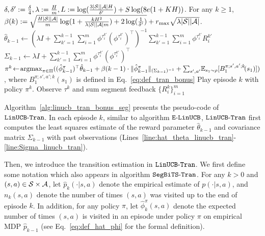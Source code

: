\begin{algorithm}[t]
	\caption{$\linucbtranseg$} \label{alg:linucb_tran_bonus_seg}
	\begin{algorithmic}[1]
	 $\delta,\delta':=\frac{\delta}{4},\lambda:=\frac{H}{m},L:=\log(\frac{3|\mathcal{S}||\mathcal{A}|H}{\delta'})+S\log(8e(1+KH))$. For any $k\geq1$, $\beta(k):=\sqrt{\frac{H|\mathcal{S}||\mathcal{A}|}{m} \log(1+\frac{kH^2}{\lambda|\mathcal{S}||\mathcal{A}|m})+2\log(\frac{1}{\delta'})} + r_{\max} \sqrt{\lambda|\mathcal{S}||\mathcal{A}|}$.
		\STATE $\hat{\theta}_{k-1} \leftarrow (\lambda I + \sum_{k'=1}^{k-1} \sum_{i=1}^{m} \phi^{\tau^{k'}_i} (\phi^{\tau^{k'}_i})^\top)^{-1} \sum_{k'=1}^{k-1} \sum_{i=1}^{m} \phi^{\tau^{k'}_i} R^{k'}_i$\; \label{line:hat_theta_linucb_tran}
		\STATE $\Sigma_{k-1} \leftarrow \lambda I + \sum_{k'=1}^{k-1} \sum_{i=1}^{m} \phi^{\tau^{k'}_i} (\phi^{\tau^{k'}_i})^\top$\; \label{line:Sigma_linucb_tran}
		\STATE $\pi^k \!\leftarrow\! \argmax_{\pi \in \Pi} ((\hat{\phi}_{k-1}^{\pi})^\top \hat{\theta}_{k-1} + \beta(k-1) \cdot  \|\hat{\phi}_{k-1}^{\pi}\|_{(\Sigma_{k-1})^{-1}} + \sum_{s',a'}\! \ex_{s_1 \sim \rho}[B^{\pi;s',a';k}_1\!(s_1)] )$, where $B^{\pi;s',a';k}_1(s_1)$ is defined in Eq.~\eqref{eq:def_tran_bonus}\; \label{line:pi_k_linucb_tran}
		\STATE Play episode $k$ with policy $\pi^k$. Observe $\tau^k$ and sum segment feedback $\{R^k_i\}_{i=1}^{m}$\; \label{line:play_linucb_tran}
	\ENDFOR	
	\end{algorithmic}
\end{algorithm}

Algorithm~\ref{alg:linucb_tran_bonus_seg} presents the pseudo-code of $\linucbtranseg$.
In each episode $k$, similar to algorithm $\mathtt{E\mbox{-}LinUCB}$, $\linucbtranseg$ first computes the least squares estimate of the reward parameter $\hat{\theta}_{k-1}$ and  covariance matrix $\Sigma_{k-1}$ with past observations (Lines~\ref{line:hat_theta_linucb_tran}-\ref{line:Sigma_linucb_tran}).

Then, we introduce the transition estimation in $\linucbtranseg$.
We first define some notation which also appears in algorithm $\mathtt{SegBiTS\mbox{-}Tran}$.
For any $k>0$ and $(s,a) \in \mathcal{S} \times \mathcal{A}$, let $\hat{p}_{k}(\cdot|s,a)$ denote the empirical estimate of $p(\cdot|s,a)$, and $n_{k}(s,a)$ denote the number of times $(s,a)$ was visited up to the end of episode $k$.
In addition, for any policy $\pi$, let $\hat{\phi}_{k}^{\pi}(s,a)$ denote the expected number of times $(s,a)$ is visited in an episode under policy $\pi$ on empirical MDP $\hat{p}_{k-1}$ (see Eq.~\eqref{eq:def_hat_phi} for the formal definition). 


